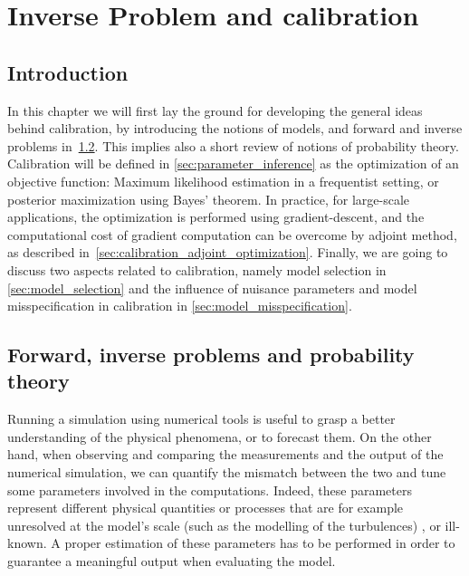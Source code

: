 \documentclass[../../Main_ManuscritThese.tex]{subfiles}
\begin{document}
\chapter{Inverse Problem and calibration}
\label{chap:inverse_problem}

\minitoc
\newpage
\subfileLocal{\pagestyle{contentStyle}}

\section{Introduction}
\label{sec:intro_chap2}
In this chapter we will first lay the ground for developing the general ideas behind calibration, by introducing the notions of models, and forward and inverse problems in~\cref{sec:forward_inverse_problem_proba_theory}. This implies also a short review of notions of probability theory. Calibration will be defined in \cref{sec:parameter_inference} as the optimization of an objective function: Maximum likelihood estimation in a frequentist setting, or posterior maximization using Bayes' theorem. In practice, for large-scale applications, the optimization is performed using gradient-descent, and the computational cost of gradient computation can be overcome by adjoint method, as described in~\cref{sec:calibration_adjoint_optimization}. Finally, we are going to discuss two aspects related to calibration, namely model selection in \cref{sec:model_selection} and the influence of nuisance parameters and model misspecification in calibration in \cref{sec:model_misspecification}.

\section{Forward, inverse problems and probability theory}
\label{sec:forward_inverse_problem_proba_theory}
Running a simulation using numerical tools is useful to grasp a better understanding of the physical phenomena, or to forecast them. On the other hand, when observing and comparing the measurements and the output of the numerical simulation, we can quantify the mismatch between the two and tune some parameters involved in the computations. Indeed, these parameters represent different physical quantities or processes that are for example unresolved at the model's scale (such as the modelling of the turbulences)%
, or ill-known. A proper estimation of these parameters has to be performed in order to guarantee a meaningful output when evaluating the model.
\end{document}
